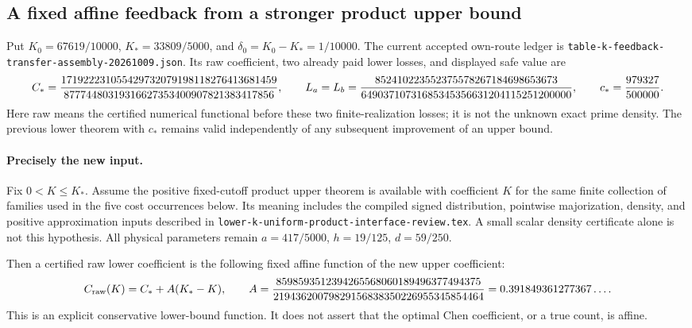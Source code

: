 \subsection{A fixed affine feedback from a stronger product upper bound}

Put $K_0=67619/10000$, $K_*=33809/5000$, and
$\delta_0=K_0-K_*=1/10000$. The current accepted own-route ledger is
\texttt{table-k-feedback-transfer-assembly-20261009.json}. Its raw
coefficient, two already paid lower losses, and displayed safe value are
\[
 C_*={171922231055429732079198118276413681459\over
             87774480319316627353400907821383417856},\qquad
 L_a=L_b={852410223552375578267184698653673\over
             64903710731685345356631204115251200000},\qquad
 c_*={979327\over500000}.
\]
Here raw means the certified numerical functional before these two
finite-realization losses; it is not the unknown exact prime density.
The previous lower theorem with $c_*$ remains valid independently of
any subsequent improvement of an upper bound.

\paragraph{Precisely the new input.}
Fix $0<K\le K_*$. Assume the positive fixed-cutoff product upper theorem
is available with coefficient $K$ for the same finite collection of
families used in the five cost occurrences below. Its meaning includes
the compiled signed distribution, pointwise majorization, density, and
positive approximation inputs described in
\texttt{lower-k-uniform-product-interface-review.tex}. A small scalar
density certificate alone is not this hypothesis. All physical
parameters remain $a=417/5000$, $h=19/125$, $d=59/250$.

Then a certified raw lower coefficient is the following fixed affine
function of the new upper coefficient:
\begin{equation}\label{eq:current-lower-fixed-affine-feedback}
 C_{\rm raw}(K)=C_*+A(K_*-K),\qquad
 A={8598593512394265568060189496377494375\over
          21943620079829156838350226955345854464}
   =0.391849361277367\ldots.
\end{equation}
This is an explicit conservative lower-bound function. It does not
assert that the optimal Chen coefficient, or a true count, is affine.

